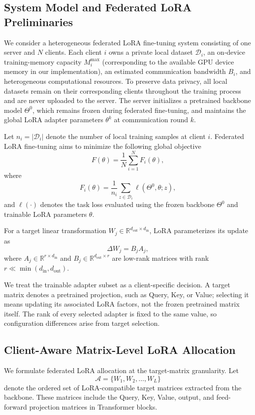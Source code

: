 \documentclass[10pt,conference,letterpaper]{IEEEtran}
\begin{document}
\subsection{System Model and Federated LoRA Preliminaries}
We consider a heterogeneous federated LoRA fine-tuning system consisting of one server and $N$ clients. Each client $i$ owns a private local dataset $\mathcal{D}_i$, an on-device training-memory capacity $M_i^{\max}$ (corresponding to the available GPU device memory in our implementation), an estimated communication bandwidth $B_i$, and heterogeneous computational resources. To preserve data privacy, all local datasets remain on their corresponding clients throughout the training process and are never uploaded to the server. The server initializes a pretrained backbone model $\Theta^0$, which remains frozen during federated fine-tuning, and maintains the global LoRA adapter parameters $\theta^k$ at communication round $k$.

Let $n_i=|\mathcal{D}_i|$ denote the number of local  training samples at client $i$. Federated LoRA fine-tuning aims to minimize the following global objective
\begin{equation}
F(\theta)=\frac{1}{N}\sum_{i=1}^{N}F_i(\theta),
\end{equation}
where
\begin{equation}
F_i(\theta)=
\frac{1}{n_i}
\sum_{z\in\mathcal{D}_i}
\ell(\Theta^0,\theta;z),
\label{eq:fl-objective}
\end{equation}
and $\ell(\cdot)$ denotes the task loss evaluated using the frozen backbone $\Theta^0$ and trainable LoRA parameters $\theta$.

For a target linear transformation $W_j\in\mathbb{R}^{d_{\mathrm{out}}\times d_{\mathrm{in}}}$, LoRA parameterizes its update as
\begin{equation}
\Delta W_j=B_jA_j,
\end{equation}
where $A_j\in\mathbb{R}^{r\times d_{\mathrm{in}}}$ and $B_j\in\mathbb{R}^{d_{\mathrm{out}}\times r}$ are low-rank matrices with rank $r\ll \min(d_{\mathrm{in}},d_{\mathrm{out}})$.

We treat the trainable adapter subset as a client-specific decision. A target matrix denotes a pretrained projection, such as Query, Key, or Value; selecting it means updating its associated LoRA factors, not the frozen pretrained matrix itself. The rank of every selected adapter is fixed to the same value, so configuration differences arise from target selection.

\subsection{Client-Aware Matrix-Level LoRA Allocation}
We formulate federated LoRA allocation at the target-matrix granularity.
Let
\begin{equation}
\mathcal{A}=\{W_1,W_2,\ldots,W_L\}
\end{equation}
denote the ordered set of LoRA-compatible target matrices extracted from the
backbone. These matrices include the Query, Key, Value, output, and feed-forward projection matrices in Transformer blocks. 
\end{document}
